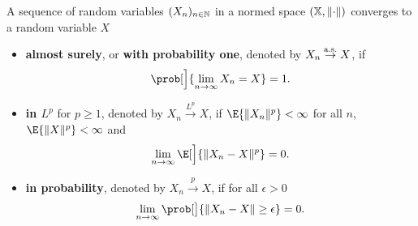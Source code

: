 \begin{mdframed}[innertopmargin=0pt]
\begin{definition}
    \label{def: types of convergence}
    A sequence of random variables \((X_n)_{n\in \mathbb{N}}\) in a normed
    space \((\mathbb{X}, \lVert\cdot\rVert)\) converges to a random variable \(X\)
    \begin{itemize}
        \item \textbf{almost surely}, or \textbf{with probability one}, denoted by \(X_n \overset{\operatorname{\text{a.s.}}}\to X\), if
        \[
            \prob[\Big]{\lim_{n \to \infty} X_n = X} = 1.
        \]

        \item \textbf{in \(L^p\)} for \(p \geq 1\), denoted by \(X_n \overset{L^p}\to X\), if \(\E{\norm{X_n}^p} < \infty\) for all \(n\), \(\E{\norm{X}^p} < \infty\)
        and
        \[
            \lim_{n \to \infty} \E[\Big]{\norm{X_n - X}^p} = 0.
        \]

        \item \textbf{in probability}, denoted by \(X_n \overset{p}\to X\), if for all \(\epsilon > 0\)
        \[
            \lim_{n \to \infty} \prob[\big]{\norm{X_n- X} \ge \epsilon} = 0.
        \]


\end{itemize}
\end{definition}
\end{mdframed}
